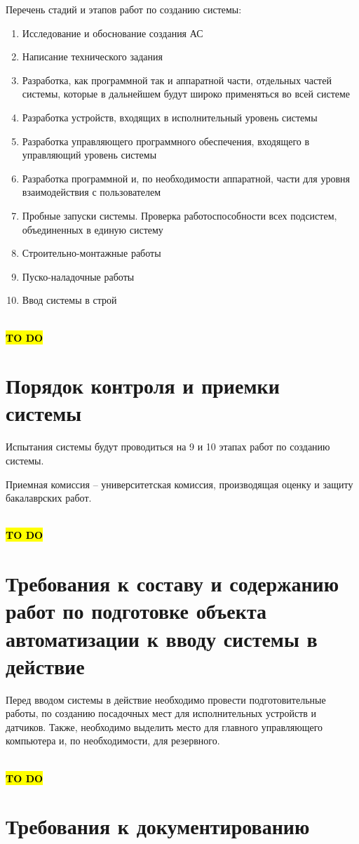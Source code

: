 \documentclass[a4paper, 12pt, titlepage]{article}
\begin{document}
Перечень стадий и этапов работ по созданию системы:
\begin{enumerate}
\item Исследование и обоснование создания АС
\item Написание технического задания
\item Разработка, как программной так и аппаратной части, отдельных частей системы, которые в дальнейшем будут широко 
применяться во всей системе
\item Разработка устройств, входящих в исполнительный уровень системы
\item Разработка управляющего программного обеспечения, входящего в управляющий уровень системы
\item Разработка программной и, по необходимости аппаратной, части для уровня взаимодействия с пользователем
\item Пробные запуски системы. Проверка работоспособности всех подсистем, объединенных в единую систему
\item Строительно-монтажные работы
\item Пуско-наладочные работы
\item Ввод системы в строй
\end{enumerate}

\\
\hl{\bf TO DO}
\section{Порядок контроля и приемки системы}

Испытания системы будут проводиться на 9 и 10 этапах работ по созданию системы.

Приемная комиссия -- университетская комиссия, производящая оценку и защиту бакалаврских работ.

\\
\hl{\bf TO DO}
\section{Требования к составу и содержанию работ по подготовке объекта автоматизации к вводу системы в действие}

Перед вводом системы в действие необходимо провести подготовительные работы, по созданию посадочных мест для исполнительных 
устройств и датчиков. Также, необходимо выделить место для главного управляющего компьютера и, по необходимости, для резервного.

\\
\hl{\bf TO DO}
\section{Требования к документированию}
\end{document}
